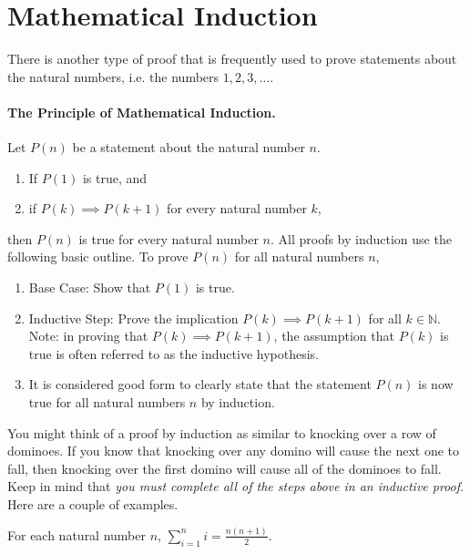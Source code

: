 \section{Mathematical Induction}

There is another type of proof that is frequently used to prove statements about the natural numbers, i.e. the numbers $1,2,3,\ldots$.

\paragraph{The Principle of Mathematical Induction.} Let $P(n)$ be a statement about the natural number $n$.
\begin{enumerate}
\item If $P(1)$ is true, and 
\item if $P(k)\implies P(k+1)$ for every natural number $k$,
\end{enumerate}
then $P(n)$ is true for every natural number $n$.
\bigbreak
All proofs by induction use the following basic outline.  To prove $P(n)$ for all natural numbers $n$,
\begin{enumerate}
\item Base Case: Show that $P(1)$ is true.
\item Inductive Step: Prove the implication $P(k)\implies P(k+1)$ for all $k\in\mathbb N$.  Note: in proving that $P(k)\implies P(k+1)$, the assumption that $P(k)$ is true is often referred to as the inductive hypothesis.
\item It is considered good form to clearly state that the statement $P(n)$ is now true for all natural numbers $n$ by induction.
\end{enumerate}
You might think of a proof by induction as similar to knocking over a row of dominoes.  If you know that knocking over any domino will cause the next one to fall, then knocking over the first domino will cause all of the dominoes to fall. Keep in mind that \emph{you must complete all of the steps above in an inductive proof}.  Here are a couple of examples.

\begin{thrm}
For each natural number $n$, $\sum\limits_{i=1}^n i=\frac{n(n+1)}2$.
\end{thrm}

